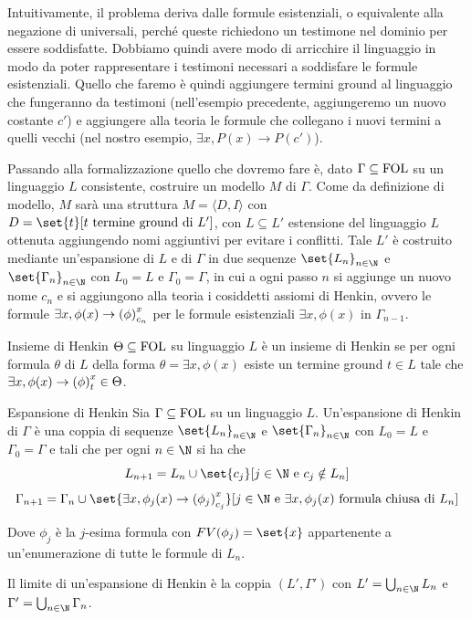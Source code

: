 Intuitivamente, il problema deriva dalle formule esistenziali, o equivalente alla negazione di universali, perché queste richiedono un testimone nel dominio per essere soddisfatte. Dobbiamo quindi avere modo di arricchire il linguaggio in modo da poter rappresentare i testimoni necessari a soddisfare le formule esistenziali. Quello che faremo è quindi aggiungere termini ground al linguaggio che fungeranno da testimoni (nell'esempio precedente, aggiungeremo un nuovo costante \(c'\)) e aggiungere alla teoria le formule che collegano i nuovi termini a quelli vecchi (nel nostro esempio, \(\exists x, P(x) \to P(c')\)).

Passando alla formalizzazione quello che dovremo fare è, dato \(\Gamma \subseteq \FOL\) su un linguaggio \(L\) consistente, costruire un modello \(M\) di \(\Gamma\). Come da definizione di modello, \(M\) sarà una struttura \(M = \langle D, I\rangle\) con \(D = \set{t}[t \text{ termine ground di } L']\), con \(L\subseteq L'\) estensione del linguaggio \(L\) ottenuta aggiungendo nomi aggiuntivi per evitare i conflitti. Tale \(L'\) è costruito mediante un'espansione di \(L\) e di \(\Gamma\) in due sequenze \(\set{L_n}_{n\in\N}\) e \(\set{\Gamma_n}_{n\in\N}\) con \(L_0 = L\) e \(\Gamma_0 = \Gamma\), in cui a ogni passo \(n\) si aggiunge un nuovo nome \(c_n\) e si aggiungono alla teoria i cosiddetti assiomi di Henkin, ovvero le formule \(\exists x, \phi(x) \to {{\left(\phi\right)}^{x}_{c_n}}\) per le formule esistenziali \(\exists x, \phi(x)\) in \(\Gamma_{n-1}\).

\begin{definition}{Insieme di Henkin}
  \(\Theta \subseteq \FOL\) su linguaggio \(L\) è un insieme di Henkin se per ogni formula \(\theta\) di \(L\) della forma \(\theta = \exists x, \phi(x)\) esiste un termine ground \(t \in L\) tale che \(\exists x, \phi(x) \to {{\left(\phi\right)}^{x}_{t}} \in \Theta\).
\end{definition}

\begin{definition}{Espansione di Henkin}
  Sia \(\Gamma \subseteq \FOL\) su un linguaggio \(L\). Un'espansione di Henkin di \(\Gamma\) è una coppia di sequenze \(\set{L_n}_{n\in\N}\) e \(\set{\Gamma_n}_{n\in\N}\) con \(L_0 = L\) e \(\Gamma_0 = \Gamma\) e tali che per ogni \(n\in\N\) si ha che
  \[L_{n+1} = L_n \cup \set{c_j}[j \in \N \text{ e } c_j \notin L_n]\]
  \[\Gamma_{n+1} = \Gamma_n \cup \set{\exists x, \phi_j(x) \to \subs{\phi_j}{x}{c_j}}[j \in \N \text{ e } \exists x, \phi_j(x) \text{ formula chiusa di } L_n]\]

  Dove \(\phi_j\) è la \(j\)-esima formula con \(FV(\phi_j) = \set{x}\) appartenente a un'enumerazione di tutte le formule di \(L_n\).

  Il limite di un'espansione di Henkin è la coppia \((L',\Gamma')\) con \(L' = \bigcup_{n\in\N} L_n\) e \(\Gamma' = \bigcup_{n\in\N} \Gamma_n\).
\end{definition}

